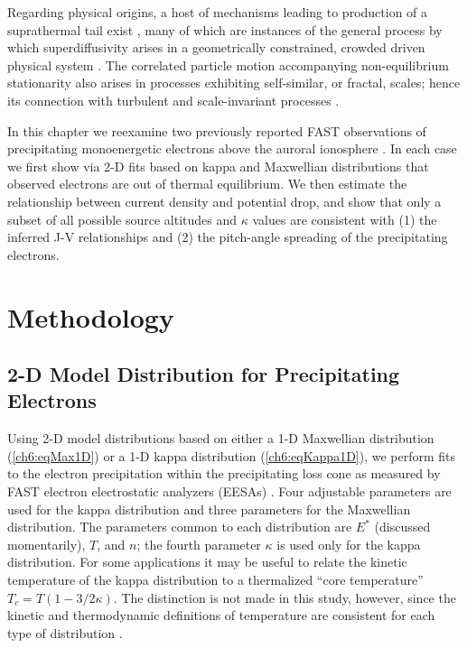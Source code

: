   Regarding physical origins, a host of mechanisms leading to production of a
  suprathermal tail exist \citep[e.g., review by][]{Pierrard2010}, many of which
  are instances of the general process by which superdiffusivity arises in a
  geometrically constrained, crowded driven physical system
  \citep{Benichou2013}.  The correlated particle motion accompanying
  non-equilibrium stationarity also arises in processes exhibiting self-similar,
  or fractal, scales; hence its connection with turbulent and scale-invariant
  processes \citep{West1990,Treumann1999a,Leubner2004}.

  In this chapter we reexamine two previously reported FAST observations of
  precipitating monoenergetic electrons above the auroral ionosphere
  \citep{Elphic1998,Ergun1998a}. In each case we first show via 2-D fits based
  on kappa and Maxwellian distributions that observed electrons are out of
  thermal equilibrium. We then estimate the relationship between current density
  and potential drop, and show that only a subset of all possible source
  altitudes and $\kappa$ values are consistent with (1) the inferred J-V
  relationships and (2) the pitch-angle spreading of the precipitating
  electrons.

  \section{Methodology}

  \subsection{2-D Model Distribution for Precipitating Electrons} \label{ss2D}

  Using 2-D model distributions based on either a 1-D Maxwellian distribution
  (\ref{ch6:eqMax1D}) or a 1-D kappa distribution (\ref{ch6:eqKappa1D}), we
  perform fits to the electron precipitation within the precipitating loss cone
  as measured by FAST electron electrostatic analyzers (EESAs) \citep{Carlson2001}. Four
  adjustable parameters are used for the kappa distribution and three parameters
  for the Maxwellian distribution. The parameters common to each distribution
  are $E^*$ (discussed momentarily), $T$, and $n$; the fourth parameter $\kappa$
  is used only for the kappa distribution. For some applications
  \citep[e.g.,][]{Sutherland2012} it may be useful to relate the kinetic
  temperature of the kappa distribution to a thermalized ``core temperature''
  $T_c = T (1-3/2 \kappa)$. The distinction is not made in this study, however,
  since the kinetic and thermodynamic definitions of temperature are consistent
  for each type of distribution \citep{Livadiotis2010}.

